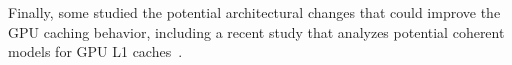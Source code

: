 

Finally, some studied the potential architectural changes that could improve the GPU caching
behavior, including a recent study that analyzes potential coherent models for GPU L1
caches~\cite{singh2013cache}.
